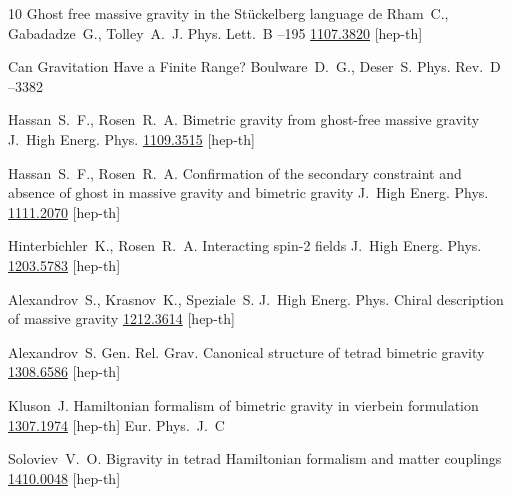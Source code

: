 \begin{thebibliography}{10}
\paper Ghost free massive gravity in the St\"uckelberg language
\by  de Rham~C.,  Gabadadze~G., Tolley~A.~J.
\jour Phys. Lett.~B 
--195
\arxiv \href{http://arxiv.org/abs/1107.3820}{1107.3820} [hep-th]

\paper Can Gravitation Have a Finite Range?
\by Boulware~D.~G.,  Deser~S.
\jour Phys. Rev.~D 
--3382

\by	 	Hassan~S.~F., Rosen~R.~A.
\paper  Bimetric gravity from ghost-free massive gravity
\jour J.~High Energ. Phys. 
\arxiv \href{http://arxiv.org/abs/1109.3515}{1109.3515} [hep-th]


\by	 	Hassan~S.~F., Rosen~R.~A.
\paper Confirmation of the secondary constraint and absence of ghost in massive gravity and bimetric gravity
\jour J.~High Energ. Phys. 
\arxiv \href{http://arxiv.org/abs/1111.2070}{1111.2070} [hep-th]


\by Hinterbichler~K., Rosen~R.~A.
\paper  Interacting spin-2 fields 
\jour J.~High Energ. Phys. 
\arxiv \href{http://arxiv.org/abs/1203.5783}{1203.5783} [hep-th] 


\by Alexandrov~S., Krasnov~K., Speziale~S.
\jour J.~High Energ. Phys. 
\paper Chiral description of massive gravity 
\arxiv \href{http://arxiv.org/abs/1212.3614}{1212.3614} [hep-th] 



\by Alexandrov~S.
\jour Gen. Rel. Grav.
\paper  Canonical structure of tetrad bimetric gravity 
\arxiv \href{http://arxiv.org/abs/1308.6586}{1308.6586} [hep-th] 


\by Kluson~J. 
\paper Hamiltonian formalism of bimetric gravity in vierbein formulation
\arxiv \href{http://arxiv.org/abs/1307.1974}{1307.1974} [hep-th] 
\jour Eur. Phys.~J.~C 


\by Soloviev~V.~O.
\preprint Bigravity in tetrad Hamiltonian formalism and matter couplings
\preprintinfo \arxiv \href{http://arxiv.org/abs/1410.0048}{1410.0048} [hep-th] 



\end{thebibliography}
